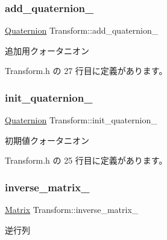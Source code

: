 \subsubsection{\texorpdfstring{add\+\_\+quaternion\+\_\+}{add\_quaternion\_}}
{\footnotesize\ttfamily \mbox{\hyperlink{_vector3_d_8h_a3ee38c9c46d9851e33a9a1113328dafc}{Quaternion}} Transform\+::add\+\_\+quaternion\+\_\+\hspace{0.3cm}{\ttfamily [private]}}



追加用クォータニオン 



 Transform.\+h の 27 行目に定義があります。

\mbox{\label{class_transform_ac0637721b2a1f2e10dca46caa9a0d77d}} 
\subsubsection{\texorpdfstring{init\+\_\+quaternion\+\_\+}{init\_quaternion\_}}
{\footnotesize\ttfamily \mbox{\hyperlink{_vector3_d_8h_a3ee38c9c46d9851e33a9a1113328dafc}{Quaternion}} Transform\+::init\+\_\+quaternion\+\_\+\hspace{0.3cm}{\ttfamily [private]}}



初期値クォータニオン 



 Transform.\+h の 25 行目に定義があります。

\mbox{\label{class_transform_a0b1d18a3f04fa8b38e6c8c1cd6d51a51}} 
\subsubsection{\texorpdfstring{inverse\+\_\+matrix\+\_\+}{inverse\_matrix\_}}
{\footnotesize\ttfamily \mbox{\hyperlink{class_matrix}{Matrix}} Transform\+::inverse\+\_\+matrix\+\_\+\hspace{0.3cm}{\ttfamily [private]}}



逆行列 



